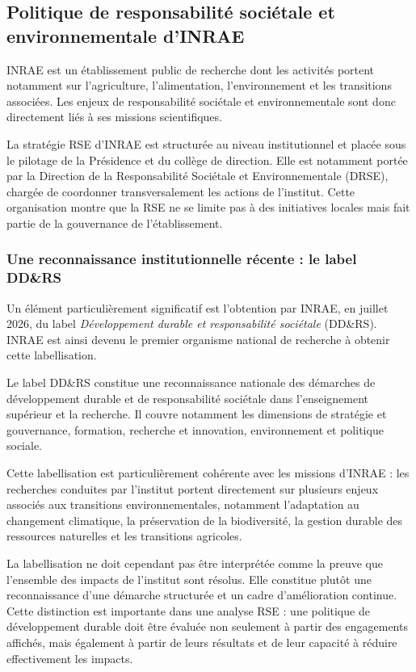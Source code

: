 \documentclass[12pt,a4paper,twoside]{article}
\begin{document}
\subsection{Politique de responsabilité sociétale et environnementale d'INRAE}
\label{subsec:rse_inrae}

INRAE est un établissement public de recherche dont les activités portent notamment sur l'agriculture, l'alimentation, l'environnement et les transitions associées. Les enjeux de responsabilité sociétale et environnementale sont donc directement liés à ses missions scientifiques.

La stratégie RSE d'INRAE est structurée au niveau institutionnel et placée sous le pilotage de la Présidence et du collège de direction. Elle est notamment portée par la Direction de la Responsabilité Sociétale et Environnementale (DRSE), chargée de coordonner transversalement les actions de l'institut. Cette organisation montre que la RSE ne se limite pas à des initiatives locales mais fait partie de la gouvernance de l'établissement.

\subsubsection{Une reconnaissance institutionnelle récente : le label DD\&RS}

Un élément particulièrement significatif est l'obtention par INRAE, en juillet 2026, du label \textit{Développement durable et responsabilité sociétale} (DD\&RS). INRAE est ainsi devenu le premier organisme national de recherche à obtenir cette labellisation.

Le label DD\&RS constitue une reconnaissance nationale des démarches de développement durable et de responsabilité sociétale dans l'enseignement supérieur et la recherche. Il couvre notamment les dimensions de stratégie et gouvernance, formation, recherche et innovation, environnement et politique sociale.

Cette labellisation est particulièrement cohérente avec les missions d'INRAE : les recherches conduites par l'institut portent directement sur plusieurs enjeux associés aux transitions environnementales, notamment l'adaptation au changement climatique, la préservation de la biodiversité, la gestion durable des ressources naturelles et les transitions agricoles.

La labellisation ne doit cependant pas être interprétée comme la preuve que l'ensemble des impacts de l'institut sont résolus. Elle constitue plutôt une reconnaissance d'une démarche structurée et un cadre d'amélioration continue. Cette distinction est importante dans une analyse RSE : une politique de développement durable doit être évaluée non seulement à partir des engagements affichés, mais également à partir de leurs résultats et de leur capacité à réduire effectivement les impacts.
\end{document}
